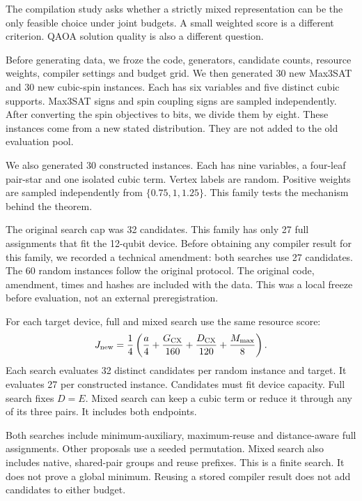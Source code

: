 \documentclass[a4paper,onecolumn,11pt,unpublished]{quantumarticle}
\theoremstyle{remark}
\begin{document}
The compilation study asks whether a strictly mixed representation can be
the only feasible choice under joint budgets. A small weighted score is a
different criterion. QAOA solution quality is also a different question.

Before generating data, we froze the code, generators, candidate counts,
resource weights, compiler settings and budget grid. We then generated
30 new Max3SAT and 30 new cubic-spin instances. Each has six variables and
five distinct cubic supports. Max3SAT signs and spin coupling signs are
sampled independently. After converting the spin objectives to bits, we
divide them by eight. These instances come from a new stated distribution.
They are not added to the old evaluation pool.

We also generated 30 constructed instances. Each has nine variables, a
four-leaf pair-star and one isolated cubic term. Vertex labels are random.
Positive weights are sampled independently from $\{0.75,1,1.25\}$.
This family tests the mechanism behind the theorem.

The original search cap was 32 candidates. This family has only 27 full
assignments that fit the 12-qubit device. Before obtaining any compiler
result for this family, we recorded a technical amendment: both searches
use 27 candidates. The 60 random instances follow the original protocol.
The original code, amendment, times and hashes are included with the data.
This was a local freeze before evaluation, not an external preregistration.

For each target device, full and mixed search use the same resource score:
\begin{equation}
 J_{\rm new}=\frac14\left(\frac{a}{4}+\frac{G_{\rm CX}}{160}
                    +\frac{D_{\rm CX}}{120}+\frac{M_{\max}}{8}\right).
 \label{eq:new-compiled-score}
\end{equation}
Each search evaluates 32 distinct candidates per random instance and target.
It evaluates 27 per constructed instance. Candidates must fit device capacity.
Full search fixes $D=E$. Mixed search can keep a cubic term or reduce it
through any of its three pairs. It includes both endpoints.

Both searches include minimum-auxiliary, maximum-reuse and distance-aware
full assignments. Other proposals use a seeded permutation.
Mixed search also includes native, shared-pair groups and reuse prefixes.
This is a finite search. It does not prove a global minimum.
Reusing a stored compiler result does not add candidates to either budget.
\end{document}
